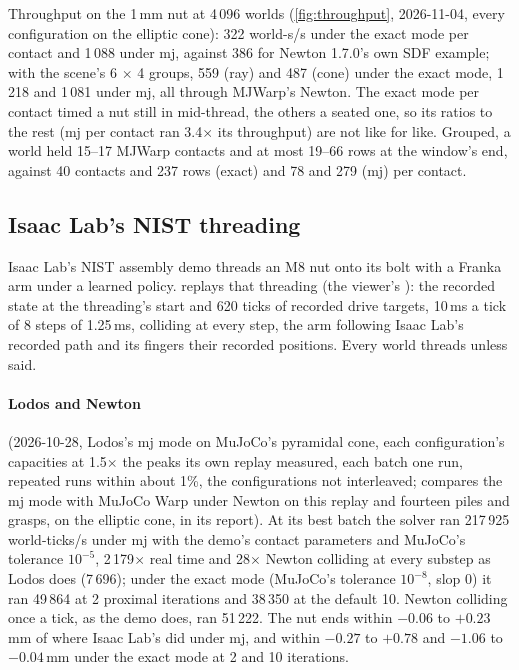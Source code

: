 Throughput on the 1\,mm nut at 4\,096 worlds (\cref{fig:throughput}, 2026-11-04, every configuration on the elliptic cone): 322 world-s/s under the exact mode per contact and 1\,088 under mj, against 386 for Newton 1.7.0's own SDF example; with the scene's 6 $\times$ 4 groups, 559 (ray) and 487 (cone) under the exact mode, 1\,218 and 1\,081 under mj, all through MJWarp's Newton. The exact mode per contact timed a nut still in mid-thread, the others a seated one, so its ratios to the rest (mj per contact ran 3.4$\times$ its throughput) are not like for like. Grouped, a world held 15--17 MJWarp contacts and at most 19--66 rows at the window's end, against 40 contacts and 237 rows (exact) and 78 and 279 (mj) per contact.

\subsection{Isaac Lab's NIST threading}\label{sec:threading}

Isaac Lab's NIST assembly demo threads an M8 nut onto its bolt with a Franka arm under a learned policy.  replays that threading (the viewer's ): the recorded state at the threading's start and 620 ticks of recorded drive targets, 10\,ms a tick of 8 steps of 1.25\,ms, colliding at every step, the arm following Isaac Lab's recorded path and its fingers their recorded positions. Every world threads unless said.

\paragraph{Lodos and Newton} (2026-10-28, Lodos's mj mode on MuJoCo's pyramidal cone, each configuration's capacities at 1.5$\times$ the peaks its own replay measured, each batch one run, repeated runs within about 1\%, the configurations not interleaved;  compares the mj mode with MuJoCo Warp under Newton on this replay and fourteen piles and grasps, on the elliptic cone, in its report). At its best batch the solver ran 217\,925 world-ticks/s under mj with the demo's contact parameters and MuJoCo's tolerance $10^{-5}$, 2\,179$\times$ real time and 28$\times$ Newton colliding at every substep as Lodos does (7\,696); under the exact mode (MuJoCo's tolerance $10^{-8}$, slop 0) it ran 49\,864 at 2 proximal iterations and 38\,350 at the default 10. Newton colliding once a tick, as the demo does, ran 51\,222. The nut ends within $-0.06$ to $+0.23$\,mm of where Isaac Lab's did under mj, and within $-0.27$ to $+0.78$ and $-1.06$ to $-0.04$\,mm under the exact mode at 2 and 10 iterations.

